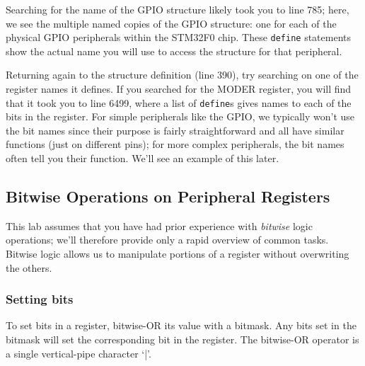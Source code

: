 \documentclass[openany,11pt,fleqn]{book} %
\begin{document}
Searching for the name of the GPIO structure likely took you to line 785; here, we see the multiple named copies of the GPIO structure: one for each of the physical GPIO peripherals within the STM32F0 chip. These \texttt{define} statements show the actual name you will use to access the structure for that peripheral.

Returning again to the structure definition (line 390), try searching on one of the register names it defines. If you searched for the MODER register, you will find that it took you to line 6499, where a list of \texttt{define}s gives names to each of the bits in the register. For simple peripherals like the GPIO, we typically won't use the bit names since their purpose is fairly straightforward and all have similar functions (just on different pins); for more complex peripherals, the bit names often tell you their function. We'll see an example of this later.

%
%    
%    
%    

%


\subsection{Bitwise Operations on Peripheral Registers}

This lab assumes that you have had prior experience with \textit{bitwise} logic operations; we'll therefore provide only a rapid overview of common tasks. Bitwise logic allows us to manipulate portions of a register without overwriting the others.

\subsubsection{Setting bits}
To set bits in a register, bitwise-OR its value with a bitmask. Any bits set in the bitmask will set the corresponding bit in the register. The bitwise-OR operator is a single vertical-pipe character `|'.
\end{document}
